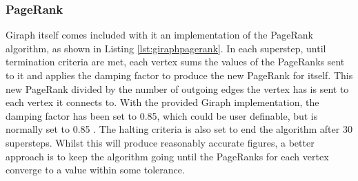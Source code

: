\subsubsection{PageRank}
Giraph itself comes included with it an implementation of the PageRank algorithm, as shown in Listing \ref{lst:giraphpagerank}. In each superstep, until termination criteria are met, each vertex sums the values of the PageRanks sent to it and applies the damping factor to produce the new PageRank for itself. This new PageRank divided by the number of outgoing edges the vertex has is sent to each vertex it connects to. With the provided Giraph implementation, the damping factor has been set to 0.85, which could be user definable, but is normally set to 0.85 \cite{brin98}. The halting criteria is also set to end the algorithm after 30 supersteps. Whilst this will produce reasonably accurate figures, a better approach is to keep the algorithm going until the PageRanks for each vertex converge to a value within some tolerance.

